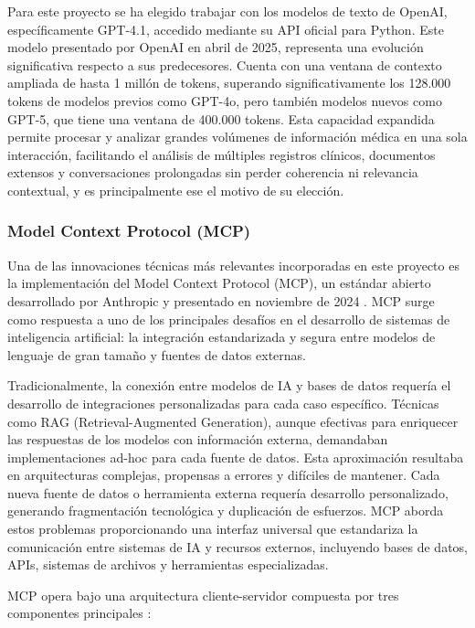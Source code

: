Para este proyecto se ha elegido trabajar con los modelos de texto de OpenAI, específicamente GPT-4.1, accedido mediante su API oficial para Python. Este modelo presentado por OpenAI en abril de 2025, representa una evolución significativa respecto a sus predecesores. Cuenta con una ventana de contexto ampliada de hasta 1 millón de tokens, superando significativamente los 128.000 tokens de modelos previos como GPT-4o, pero también modelos nuevos como GPT-5, que tiene una ventana de 400.000 tokens. Esta capacidad expandida permite procesar y analizar grandes volúmenes de información médica en una sola interacción, facilitando el análisis de múltiples registros clínicos, documentos extensos y conversaciones prolongadas sin perder coherencia ni relevancia contextual, y es principalmente ese el motivo de su elección.

\subsubsection{Model Context Protocol (MCP)}

Una de las innovaciones técnicas más relevantes incorporadas en este proyecto es la implementación del Model Context Protocol (MCP), un estándar abierto desarrollado por Anthropic y presentado en noviembre de 2024 \cite{AnthropicMCP2024}. MCP surge como respuesta a uno de los principales desafíos en el desarrollo de sistemas de inteligencia artificial: la integración estandarizada y segura entre modelos de lenguaje de gran tamaño y fuentes de datos externas.


Tradicionalmente, la conexión entre modelos de IA y bases de datos requería el desarrollo de integraciones personalizadas para cada caso específico. Técnicas como RAG (Retrieval-Augmented Generation), aunque efectivas para enriquecer las respuestas de los modelos con información externa, demandaban implementaciones ad-hoc para cada fuente de datos. Esta aproximación resultaba en arquitecturas complejas, propensas a errores y difíciles de mantener. Cada nueva fuente de datos o herramienta externa requería desarrollo personalizado, generando fragmentación tecnológica y duplicación de esfuerzos. MCP aborda estos problemas proporcionando una interfaz universal que estandariza la comunicación entre sistemas de IA y recursos externos, incluyendo bases de datos, APIs, sistemas de archivos y herramientas especializadas.


MCP opera bajo una arquitectura cliente-servidor compuesta por tres componentes principales \cite{mcp_arch}:

